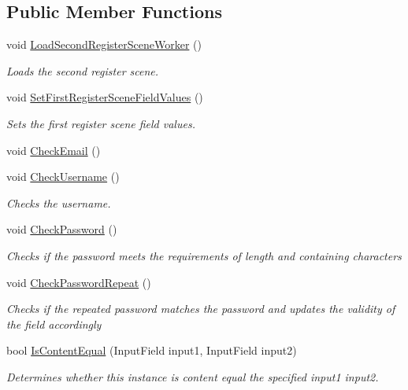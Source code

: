 \subsection*{Public Member Functions}
\begin{DoxyCompactItemize}
\item 
void \hyperlink{classRegisterSceneController_ab78b17088c92fb2d8f9bc7bc54536f7f}{Load\+Second\+Register\+Scene\+Worker} ()
\begin{DoxyCompactList}\small\item\em Loads the second register scene. \end{DoxyCompactList}\item 
void \hyperlink{classRegisterSceneController_a079ea72a1aea4a4c8a8f7ed1013156d2}{Set\+First\+Register\+Scene\+Field\+Values} ()
\begin{DoxyCompactList}\small\item\em Sets the first register scene field values. \end{DoxyCompactList}\item 
void \hyperlink{classRegisterSceneController_a3a3da6d880ef88abb72811fbd18a893b}{Check\+Email} ()
\item 
void \hyperlink{classRegisterSceneController_a79fc8fdaa225cc89fb7df61421feeb68}{Check\+Username} ()
\begin{DoxyCompactList}\small\item\em Checks the username. \end{DoxyCompactList}\item 
void \hyperlink{classRegisterSceneController_a6a534733d442b967c58b229423b6b71d}{Check\+Password} ()
\begin{DoxyCompactList}\small\item\em Checks if the password meets the requirements of length and containing characters \end{DoxyCompactList}\item 
void \hyperlink{classRegisterSceneController_aecd570e465ac294c6fb89fc88140bb89}{Check\+Password\+Repeat} ()
\begin{DoxyCompactList}\small\item\em Checks if the repeated password matches the password and updates the validity of the field accordingly \end{DoxyCompactList}\item 
bool \hyperlink{classRegisterSceneController_a7f1d806aaa9a339363112fa8b4af05bd}{Is\+Content\+Equal} (Input\+Field input1, Input\+Field input2)
\begin{DoxyCompactList}\small\item\em Determines whether this instance is content equal the specified input1 input2. \end{DoxyCompactList}\item 

\end{DoxyCompactItemize}
